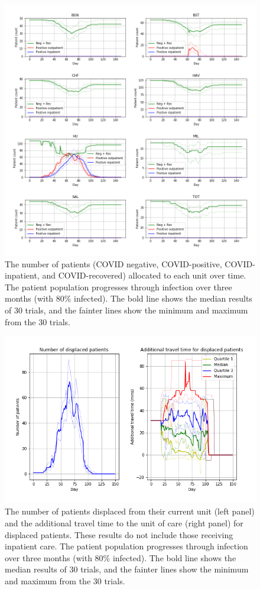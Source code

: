 \begin{figure}
\centering
\includegraphics[width=1.0\textwidth]{image/units_base_3_month.png}
\caption{The number of patients (COVID negative, COVID-positive, COVID-inpatient, and COVID-recovered) allocated to each unit over time. The patient population progresses through infection over three months (with 80\% infected). The bold line shows the median results of 30 trials, and the fainter lines show the minimum and maximum from the 30 trials.}
\label{fig:units_base_3_month}
\end{figure}

\begin{figure}
\centering
\includegraphics[width=1.0\textwidth]{image/displaced_base_3_month.png}
\caption{The number of patients displaced from their current unit (left panel) and the additional travel time to the unit of care (right panel) for displaced patients. These results do not include those receiving inpatient care. The patient population progresses through infection over three months (with 80\% infected). The bold line shows the median results of 30 trials, and the fainter lines show the minimum and maximum from the 30 trials.}
\label{fig:displaced_base_3_month}
\end{figure}

